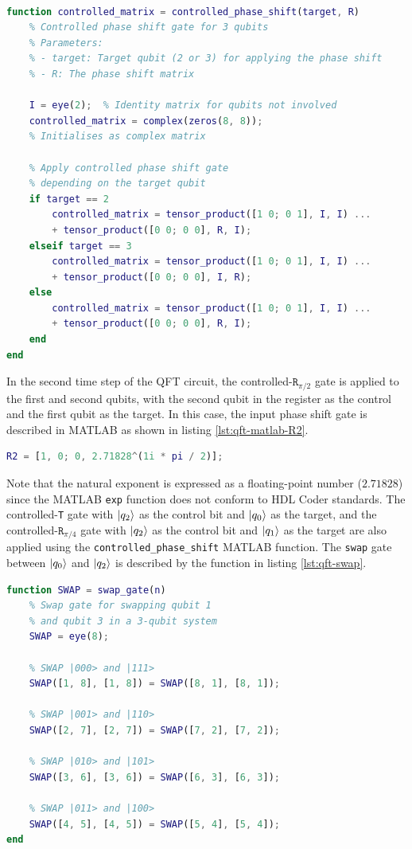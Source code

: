 \begin{lstlisting}[language=Matlab, caption={MATLAB code snippet for controlled phase shift quantum gates.}, label={lst:qft-matlab-phase}]
% ... removed code
	
function controlled_matrix = controlled_phase_shift(target, R)
    % Controlled phase shift gate for 3 qubits
    % Parameters:
    % - target: Target qubit (2 or 3) for applying the phase shift
    % - R: The phase shift matrix

    I = eye(2);  % Identity matrix for qubits not involved
    controlled_matrix = complex(zeros(8, 8));  
    % Initialises as complex matrix
 
    % Apply controlled phase shift gate 
    % depending on the target qubit
    if target == 2
        controlled_matrix = tensor_product([1 0; 0 1], I, I) ... 
        + tensor_product([0 0; 0 0], R, I);
    elseif target == 3
        controlled_matrix = tensor_product([1 0; 0 1], I, I) ...
        + tensor_product([0 0; 0 0], I, R);
    else
        controlled_matrix = tensor_product([1 0; 0 1], I, I) ...
        + tensor_product([0 0; 0 0], R, I);
    end
end
\end{lstlisting}
In the second time step of the QFT circuit, the controlled-$\texttt{R}_{\pi/2}$ gate is applied to the first and second qubits, with the second qubit in the register as the control and the first qubit as the target. In this case, the input phase shift gate is described in MATLAB as shown in listing \ref{lst:qft-matlab-R2}.
\begin{lstlisting}[language=Matlab, caption={MATLAB code snippet for controlled phase shift quantum gates.}, label={lst:qft-matlab-R2}]
% Controlled phase shift R2
R2 = [1, 0; 0, 2.71828^(1i * pi / 2)];  
\end{lstlisting}
Note that the natural exponent is expressed as a floating-point number ($2.71828$) since the MATLAB \texttt{exp} function does not conform to HDL Coder standards. The controlled-\texttt{T} gate with $\ket{q_2}$ as the control bit and $\ket{q_0}$ as the target, and the controlled-$\texttt{R}_{\pi/4}$ gate with $\ket{q_2}$ as the control bit and $\ket{q_1}$ as the target are also applied using the \texttt{controlled\_phase\_shift} MATLAB function. The \texttt{swap} gate between $\ket{q_0}$ and $\ket{q_2}$ is described by the function in listing \ref{lst:qft-swap}. 
\begin{lstlisting}[language=Matlab, caption={MATLAB code snippet describing the SWAP gate.}, label={lst:qft-swap}]
function SWAP = swap_gate(n)
	% Swap gate for swapping qubit 1 
	% and qubit 3 in a 3-qubit system
	SWAP = eye(8);
	
	% SWAP |000> and |111>
	SWAP([1, 8], [1, 8]) = SWAP([8, 1], [8, 1]);  
	
	% SWAP |001> and |110>
	SWAP([2, 7], [2, 7]) = SWAP([7, 2], [7, 2]); 
	
	% SWAP |010> and |101> 
	SWAP([3, 6], [3, 6]) = SWAP([6, 3], [6, 3]);
	
	% SWAP |011> and |100>  
	SWAP([4, 5], [4, 5]) = SWAP([5, 4], [5, 4]); 
end 
\end{lstlisting} 
